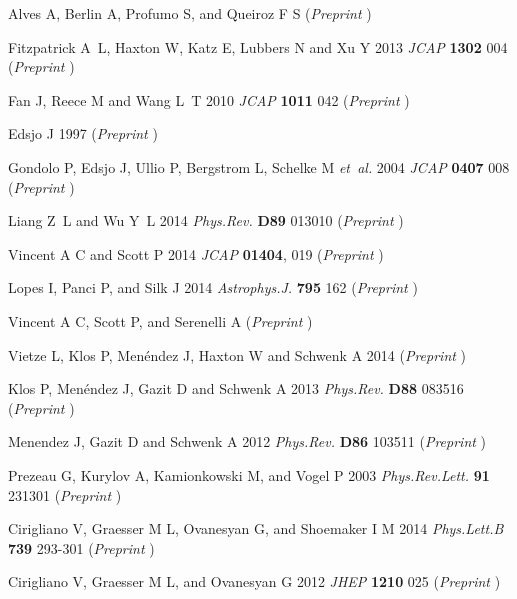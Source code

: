 \documentclass[11pt,a4paper]{article}
\begin{document}
\begin{thebibliography}{10}
Alves A, Berlin A, Profumo S, and Queiroz F S (\textit{Preprint} )

Fitzpatrick A~L, Haxton W, Katz E, Lubbers N and Xu Y 2013 {\em JCAP\/} {\bf
  1302} 004 (\textit{Preprint} )

Fan J, Reece M and Wang L~T 2010 {\em JCAP\/} {\bf 1011} 042 (\textit{Preprint}
  )

Edsjo J 1997 (\textit{Preprint} )

Gondolo P, Edsjo J, Ullio P, Bergstrom L, Schelke M {\em et~al.\/} 2004 {\em
  JCAP\/} {\bf 0407} 008 (\textit{Preprint} )
  
Liang Z~L and Wu Y~L 2014 {\em Phys.Rev.\/} {\bf D89} 013010 (\textit{Preprint}
  )  

Vincent A C and Scott P 2014 {\em JCAP\/} {\bf 01404}, 019 (\textit{Preprint}
  )  

  Lopes I, Panci P, and Silk J 2014 {\em Astrophys.J.\/}  {\bf 795} 162
  (\textit{Preprint} ) 

Vincent A C, Scott P, and Serenelli A (\textit{Preprint}
  )  
  
Vietze L, Klos P, Menéndez J, Haxton W and Schwenk A 2014  (\textit{Preprint}
  )

Klos P, Menéndez J, Gazit D and Schwenk A 2013 {\em Phys.Rev.\/} {\bf D88}
  083516 (\textit{Preprint} )

Menendez J, Gazit D and Schwenk A 2012 {\em Phys.Rev.\/} {\bf D86} 103511
  (\textit{Preprint} )

Prezeau G, Kurylov A, Kamionkowski M, and Vogel P 2003 {\em Phys.Rev.Lett.\/} {\bf 91}
  231301 (\textit{Preprint} )

Cirigliano V, Graesser M L, Ovanesyan G, and Shoemaker I M 2014 {\em Phys.Lett.B\/} {\bf 739}
  293-301 (\textit{Preprint} )

Cirigliano V, Graesser M L, and Ovanesyan G 2012 {\em JHEP\/} {\bf 1210}
  025 (\textit{Preprint} )


\end{thebibliography}
\end{document}
